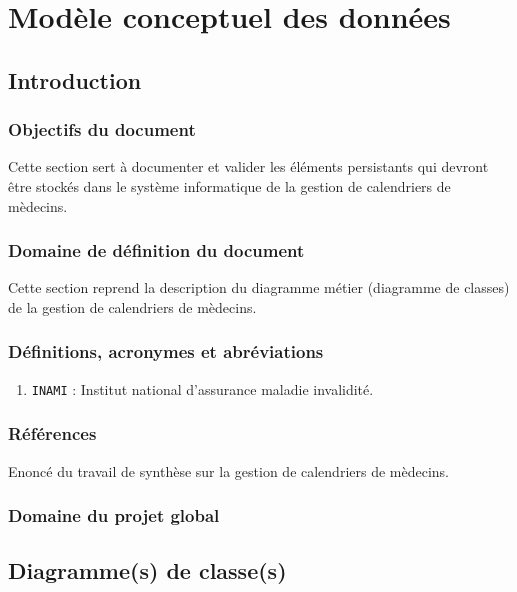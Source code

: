 \documentclass[a4paper, 11pt]{report}
\begin{document}

\tableofcontents

\chapter{Modèle conceptuel des données}

\section{Introduction}

\subsection{Objectifs du document}

Cette section sert à documenter et valider les éléments persistants qui devront
être stockés dans le système informatique de la gestion de calendriers de mèdecins.

\subsection{Domaine de définition du document}

Cette section reprend la description du diagramme métier (diagramme de classes) de la gestion de 
calendriers de mèdecins.

\subsection{Définitions, acronymes et abréviations}

\begin{enumerate}

\item \texttt{INAMI} : Institut national d'assurance maladie invalidité.

\end{enumerate}

\subsection{Références}

Enoncé du travail de synthèse sur la gestion de calendriers de mèdecins.

\subsection{Domaine du projet global}
\newpage
\section{Diagramme(s) de classe(s)}
\end{document}
